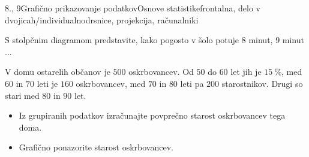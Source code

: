 \begin{priprava}{8., 9}{}{Grafično prikazovanje podatkov}{Osnove statistike}{frontalna, delo v dvojicah/individualno}{drsnice, projekcija, računalniki}
\begin{naloga}
     S stolpčnim diagramom predstavite, kako pogosto v šolo potuje $8$ minut, $9$ minut ... 

\end{naloga}

\begin{naloga}
 
    V domu ostarelih občanov je $500$ oskrbovancev. Od $50$ do $60$ let jih je $15~\%$, med $60$ in $70$ leti je $160$ oskrbovancev,
    med $70$ in $80$ leti pa $200$ starostnikov. Drugi so stari med $80$ in $90$ let.
    \begin{itemize}
        \item Iz grupiranih podatkov izračunajte povprečno starost oskrbovancev tega doma.
        \item Grafično ponazorite starost oskrbovancev.
    \end{itemize}
    
\end{naloga}




\end{priprava}
